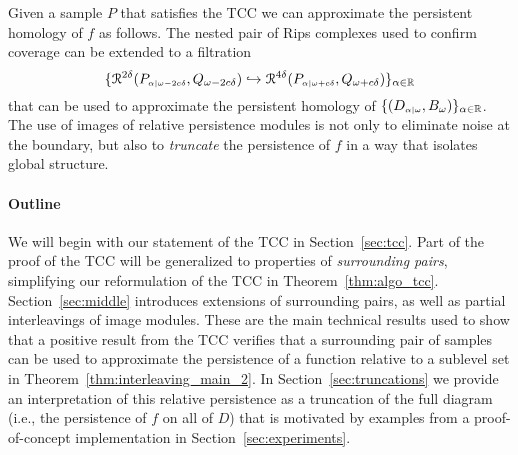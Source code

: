 Given a sample $P$ that satisfies the TCC we can approximate the persistent homology of $f$ as follows.
The nested pair of Rips complexes used to confirm coverage can be extended to a filtration
\[ \{\mathcal{R}^{2\delta}(P_{\scriptscriptstyle \alpha\mid \omega-2c\delta}, Q_{\omega-2c\delta})\hookrightarrow \mathcal{R}^{4\delta}(P_{\scriptscriptstyle \alpha\mid \omega+c\delta}, Q_{\omega+c\delta})\}_{\alpha\in\mathbb{R}}\]
that can be used to approximate the persistent homology of $\{(D_{\scriptscriptstyle \alpha\mid \omega}, B_\omega)\}_{\alpha\in\mathbb{R}}$.
The use of images of relative persistence modules is not only to eliminate noise at the boundary, but also to \emph{truncate} the persistence of $f$ in a way that isolates global structure.

\paragraph*{Outline}

We will begin with our statement of the TCC in Section~\ref{sec:tcc}.
Part of the proof of the TCC will be generalized to properties of \emph{surrounding pairs}, simplifying our reformulation of the TCC in Theorem~\ref{thm:algo_tcc}.
Section~\ref{sec:middle} introduces extensions of surrounding pairs, as well as partial interleavings of image modules.
These are the main technical results used to show that a positive result from the TCC verifies that a surrounding pair of samples can be used to approximate the persistence of a function relative to a sublevel set in Theorem~\ref{thm:interleaving_main_2}.
In Section~\ref{sec:truncations} we provide an interpretation of this relative persistence as a truncation of the full diagram (i.e., the persistence of $f$ on all of $D$) that is motivated by examples from a proof-of-concept implementation in Section~\ref{sec:experiments}.
